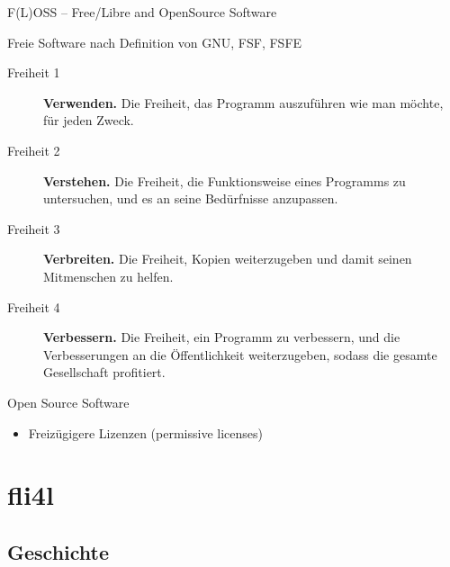 \documentclass[t]{beamer}
\makeatletter
\newcommand{\strong}[1]{\@strong{#1}}
\newcommand{\@@strong}[1]{\textbf{\let\@strong\@@@strong#1}}
\newcommand{\@@@strong}[1]{\textnormal{\let\@strong\@@strong#1}}
\let\@strong\@@strong
\makeatother
\begin{document}
\begin{frame}{F(L)OSS -- Free/Libre and OpenSource Software}
    \begin{block}{Freie Software nach Definition von GNU, FSF, FSFE}
        \begin{description}
            \item[Freiheit 1] \strong{Verwenden.} {\small Die Freiheit,
                das Programm auszuführen wie man möchte, für jeden
                Zweck.}
            \item[Freiheit 2] \strong{Verstehen.} {\small Die Freiheit,
                die Funktionsweise eines Programms zu untersuchen, und
                es an seine Bedürfnisse anzupassen.}
            \item[Freiheit 3] \strong{Verbreiten.} {\small Die Freiheit,
                Kopien weiterzugeben und damit seinen Mitmenschen zu
                helfen.}
            \item[Freiheit 4] \strong{Verbessern.} {\small Die Freiheit,
                ein Programm zu verbessern, und die Verbesserungen
                an die Öffentlichkeit weiterzugeben, sodass die
                gesamte Gesellschaft profitiert.}
        \end{description}
    \end{block}
    \pause
    \begin{block}{Open Source Software}
        \begin{itemize}
            \item Freizügigere Lizenzen (permissive licenses)
        \end{itemize}
    \end{block}
\end{frame}

\section{fli4l}

\subsection{Geschichte}
\end{document}
